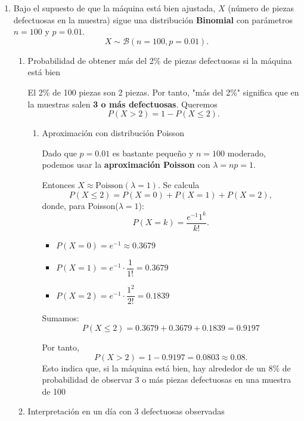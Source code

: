 \begin{enumerate}[label=\color{red}\textbf{\arabic*)}]
\begin{enumerate}[label=\arabic*), leftmargin=*]
        \end{enumerate}
\item {} 

    Bajo el supuesto de que la máquina está bien ajustada, $X$ (número de piezas defectuosas en la muestra) sigue una distribución  \textbf{Binomial}  con parámetros $n=100$ y $p=0.01$.  \[
    X\sim \mathcal{B}(n=100,p=0.01).
    \] 
    \begin{enumerate}[label=\arabic*)]
        \item Probabilidad de obtener más del 2\% de piezas defectuosas si la máquina está bien

            El 2\% de 100 piezas son 2 piezas. Por tanto, "más del 2\%" significa que en la muestras salen \textbf{3 o más defectuosas}. Queremos \[
            P(X>2)=1-P(X\le 2).
        \]
            \begin{enumerate}[label=1.\arabic*)]
                \item Aproximación con distribución Poisson

Dado que $p=0.01$ es bastante pequeño y $n=100$ moderado, podemos usar la \textbf{aproximación Poisson} con $\lambda=np=1$.

Entonces $X\approx \mathrm{Poisson}(\lambda=1)$. Se calcula \[
P(X\le 2)=P(X=0)+P(X=1)+P(X=2),
\] donde, para Poisson($\lambda=1$): \[
P(X=k)=\dfrac{e^{-1}1^k}{k!}.
\]
\begin{itemize}[label=\textbullet]
\item $P(X=0)=e^{-1}\approx 0.3679$
\item $P(X=1)=e^{-1}\cdot \dfrac{1}{1!}=0.3679 $ 
\item $P(X=2)=e^{-1} \cdot  \dfrac{1^2}{2!}=0.1839 $
\end{itemize}
Sumamos: \[
P(X\le 2)=0.3679+0.3679+0.1839=0.9197
\] 

Por tanto, \[
P(X>2)=1-0.9197=0.0803\approx 0.08.
\] 
Esto indica que, si la máquina está bien, hay alrededor de un 8\% de probabilidad de observar 3 o más piezas defectuosas en una muestra de 100
            \end{enumerate}
        \item Interpretación en un día con 3 defectuosas observadas


\end{enumerate}
\end{enumerate}
